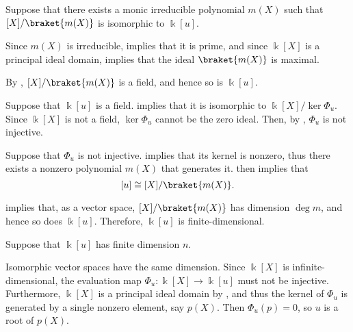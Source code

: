 \begin{defproof}
   Suppose that there exists a monic irreducible polynomial \( m(X) \) such that \( \Bbbk[X] / \braket{ m(X) } \) is isomorphic to \( \Bbbk[u] \).

  Since \( m(X) \) is irreducible,  implies that it is prime, and since \( \Bbbk[X] \) is a principal ideal domain,  implies that the ideal \( \braket{ m(X) } \) is maximal.

  By , \( \Bbbk[X] / \braket{ m(X) } \) is a field, and hence so is \( \Bbbk[u] \).

   Suppose that \( \Bbbk[u] \) is a field.  implies that it is isomorphic to \( \Bbbk[X] / \ker \Phi_u \). Since \( \Bbbk[X] \) is not a field, \( \ker \Phi_u \) cannot be the zero ideal. Then, by , \( \Phi_u \) is not injective.

   Suppose that \( \Phi_u \) is not injective.  implies that its kernel is nonzero, thus there exists a nonzero polynomial \( m(X) \) that generates it.  then implies that
  \begin{equation*}
    \Bbbk[u] \cong \Bbbk[X] / \braket{ m(X) }.
  \end{equation*}

   implies that, as a vector space, \( \Bbbk[X] / \braket{ m(X) } \) has dimension \( \deg m \), and hence so does \( \Bbbk[u] \). Therefore, \( \Bbbk[u] \) is finite-dimensional.

   Suppose that \( \Bbbk[u] \) has finite dimension \( n \).

  Isomorphic vector spaces have the same dimension. Since \( \Bbbk[X] \) is infinite-dimensional, the evaluation map \( \Phi_u: \Bbbk[X] \to \Bbbk[u] \) must not be injective. Furthermore, \( \Bbbk[X] \) is a principal ideal domain by , and thus the kernel of \( \Phi_u \) is generated by a single nonzero element, say \( p(X) \). Then \( \Phi_u(p) = 0 \), so \( u \) is a root of \( p(X) \).
\end{defproof}

